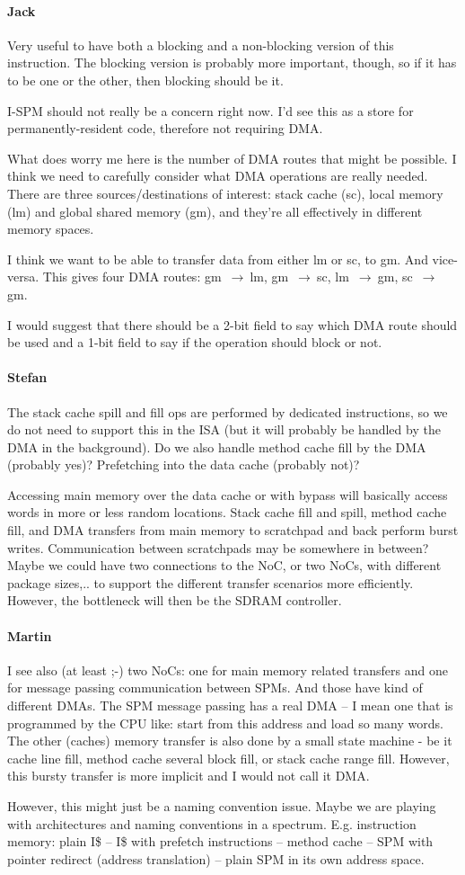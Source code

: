 \documentclass{IEEEtran}
\newcommand{\comment}[3]{\paragraph*{\textbf{#1}}{\color{#3}#2}}
\newcommand{\martin}[1]{\comment{Martin}{#1}{Blue}}
\newcommand{\stefan}[1]{\comment{Stefan}{#1}{RoyalPurple}}
\newcommand{\jack}[1]{\comment{Jack}{#1}{Magenta}}
\begin{document}
\jack{Very useful to have both a blocking and a non-blocking
version of this instruction. The blocking version is probably
more important, though, so if it has to be one or the other,
then blocking should be it.

I-SPM should not really be a concern right now. I'd see this as
a store for permanently-resident code, therefore not requiring DMA.

What does worry me here is the number of DMA routes that might be
possible. I think we need to carefully consider what DMA operations
are really needed. There are three sources/destinations of interest:
stack cache (sc), local memory (lm) and global shared memory (gm),
and they're all effectively in different memory spaces.

I think we want to be able to transfer data from either
lm or sc, to gm. And vice-versa. This gives four DMA routes:
gm~$\rightarrow~$lm, gm~$\rightarrow~$sc, lm~$\rightarrow~$gm,
sc~$\rightarrow~$gm.

I would suggest that there should be a 2-bit field to say which DMA route
should be used and a 1-bit field to say if the operation should block
or not.}

\stefan{The stack cache spill and fill ops are performed by dedicated instructions, so we do not need to support this in the ISA (but it
will probably be handled by the DMA in the background). Do we also handle method cache fill by the DMA (probably yes)? Prefetching into the data cache
(probably not)? 

Accessing main memory over the data cache or with bypass will basically access words in more or less random locations. Stack cache fill and
spill, method cache fill, and DMA transfers from main memory to scratchpad and back perform burst writes. Communication between scratchpads
may be somewhere in between? Maybe we could have two connections to the NoC, or two NoCs, with different package sizes,.. to support the
different transfer scenarios more efficiently. However, the bottleneck will
then be the SDRAM controller.}

\martin{I see also (at least ;-) two NoCs: one for main memory related transfers and one for
message passing communication between SPMs. And those have kind of different DMAs.
The SPM message passing has a real DMA -- I mean one that is programmed by the
CPU like: start from this address and load so many words. The other (caches) memory
transfer is also done by a small state machine - be it cache line fill, method cache several
block fill, or stack cache range fill. However, this bursty transfer is more implicit and
I would not call it DMA.

However, this might just be a naming convention issue. Maybe we are playing
with architectures and naming conventions in a spectrum. E.g. instruction
memory: plain I\$ -- I\$ with prefetch instructions -- method cache -- SPM with
pointer redirect (address translation) -- plain SPM in its own address space.} 
\end{document}

